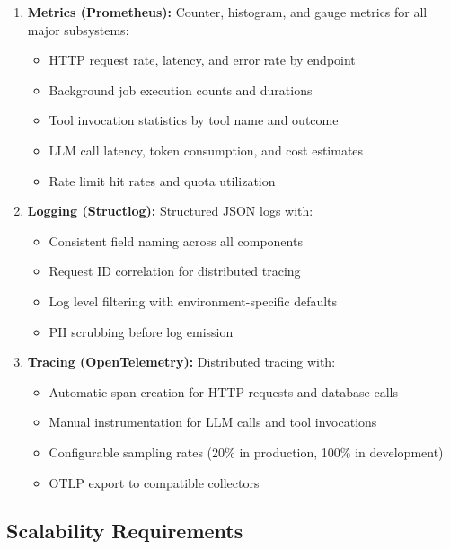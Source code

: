 \documentclass[a4paper,twoside]{sapthesis}
\begin{document}
\begin{enumerate}
    \item \textbf{Metrics (Prometheus):} Counter, histogram, and gauge metrics for all major subsystems:
    \begin{itemize}
        \item HTTP request rate, latency, and error rate by endpoint
        \item Background job execution counts and durations
        \item Tool invocation statistics by tool name and outcome
        \item LLM call latency, token consumption, and cost estimates
        \item Rate limit hit rates and quota utilization
    \end{itemize}
    
    \item \textbf{Logging (Structlog):} Structured JSON logs with:
    \begin{itemize}
        \item Consistent field naming across all components
        \item Request ID correlation for distributed tracing
        \item Log level filtering with environment-specific defaults
        \item PII scrubbing before log emission
    \end{itemize}
    
    \item \textbf{Tracing (OpenTelemetry):} Distributed tracing with:
    \begin{itemize}
        \item Automatic span creation for HTTP requests and database calls
        \item Manual instrumentation for LLM calls and tool invocations
        \item Configurable sampling rates (20\% in production, 100\% in development)
        \item OTLP export to compatible collectors
    \end{itemize}
\end{enumerate}

\subsection{Scalability Requirements}
\label{subsec:nfr-scalability}
\end{document}
